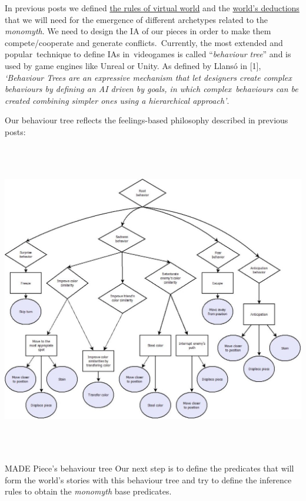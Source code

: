 \documentclass[a4paper]{article}
\newcommand\textstyleEmphasis[1]{\textit{#1}}
\begin{document}
In previous posts we defined
\href{http://www.velonuboso.com/made/2015/07/18/making-part-12-simple-powerful-virtual-world/}{the
rules of virtual world} and the
\href{http://www.velonuboso.com/made/2015/07/18/making-part-11-predicate-dependency-graph-archetypes/}{world{\textquoteright}s
deductions} that we will need for the emergence of different archetypes
related to the \textstyleEmphasis{monomyth}. We need to design the IA
of our pieces in order to make them compete/cooperate and generate
conflicts.~Currently, the most extended and popular~technique to define
IAs in~videogames is called
{\textquotedblleft}\textstyleEmphasis{behaviour
tree}{\textquotedblright} and is used by game engines like Unreal or
Unity. As defined by Llans\'o in [1],
\textstyleEmphasis{{\textquoteleft}Behaviour Trees are an expressive
mechanism that let designers create complex behaviours by defining an
AI driven by goals, in which complex~behaviours can be created
combining simpler ones using a hierarchical approach{\textquoteright}}.

Our behaviour tree reflects the feelings-based philosophy described in
previous posts:

\href{http://www.velonuboso.com/made/blog/wp-content/uploads/2015/07/piece_behaviour_tree_1.jpg}{
\includegraphics[width=16.955cm,height=13.702cm]{makingofmade113-img18.jpg}
}

MADE Piece{\textquoteright}s behaviour tree
Our next step is to define the predicates that will form the
world{\textquoteright}s stories with this behaviour tree and try to
define the inference rules to obtain the \textstyleEmphasis{monomyth}
base predicates.
\end{document}
